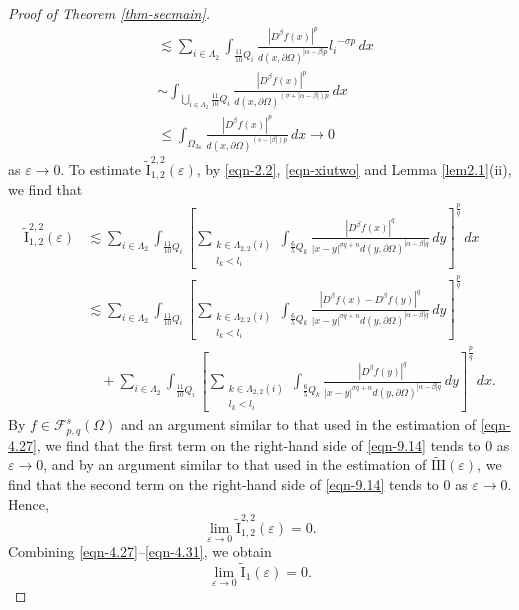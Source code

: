 \documentclass[11pt,twoside]{article}
\def\hf{{\mathscr F }}
\def\Qi{\frac{11}{10}Q_i}
\def\Qkk{\frac{6}{5}Q_k}
\def\az{\alpha}
\def\bz{\beta}
\def\boz{{\Omega}}
\def\sz{\sigma}
\def\vez{\varepsilon}
\def\pa{\partial}                %
\def\huae{\varepsilon}
\def\bozthreee{\boz_{3\huae}}
\def\huafweab{{\hf}_{p,q}^{s}(\boz)}
\theoremstyle{mylem}
\theoremstyle{definition}
\numberwithin{equation}{section}
\begin{document}
\begin{proof}[Proof of Theorem \ref{thm-secmain}]
\begin{align}
&\lesssim \sum_{i \in \Lambda_2} \int_{\Qi} \frac{ |D^\bz f(x)|^p}{{d(x,\pa\boz)}^{|\az-\bz|p}}  {l_i}^{-\sz p}\,dx\nonumber\\
&\sim \int_{\bigcup_{i \in \Lambda_2} \Qi} \frac{|D^\bz f(x)|^p}{d(x, \partial\Omega)^{(\sz+|\az-\bz|) p}}\,dx \nonumber \\
&\leq \int_{\bozthreee} \frac{|D^\bz f(x)|^p}{d(x, \partial\Omega)^{(s-|\bz|) p}}\,dx \to 0
\end{align}
as $\varepsilon \to 0.$ To estimate $\tilde{\mathrm{I}}_{1,2}^{2,2}(\vez)$, by \eqref{eqn-2.2}, \eqref{eqn-xiutwo} and Lemma \ref{lem2.1}(ii), we find that
\begin{align}\label{eqn-9.14}
\tilde{\mathrm{I}}_{1,2}^{2,2}(\vez)
&\lesssim \sum_{i \in \Lambda_2} \int_{\Qi} \left[ \sum_{\substack{k\in\Lambda_{2,2}(i) \\ l_k< l_i}}\int_{\Qkk} \frac{|D^\bz f(x)|^q }{|x - y|^{\sz q + n}d(y,\pa\boz)^{|\az-\bz|q}}\,dy \right]^{\frac{p}{q}}\,dx \nonumber\\
&\lesssim \sum_{i \in \Lambda_2} \int_{\Qi} \left[ \sum_{\substack{k\in\Lambda_{2,2}(i) \\ l_k< l_i}}\int_{\Qkk} \frac{| D^\bz f(x)-D^\bz f(y)|^q }{|x - y|^{\sz q + n}d(y,\pa\boz)^{|\az-\bz|q}} \,dy \right]^{\frac{p}{q}} \nonumber\\
&\quad+ \sum_{i \in \Lambda_2} \int_{\Qi} \left[ \sum_{\substack{k\in\Lambda_{2,2}(i) \\ l_k< l_i}}\int_{\Qkk}\frac{|D^\bz f(y)|^q }{|x - y|^{\sz q + n}d(y,\pa\boz)^{|\az-\bz|q}}\,dy \right]^{\frac{p}{q}}\,dx. 
\end{align}
By \( f \in \huafweab \) and an argument similar to that used in the estimation of \eqref{eqn-4.27}, we find that the first term on the right-hand side of \eqref{eqn-9.14} tends to 0 as $\vez\to 0$, and by an argument similar to that used in the estimation of  $\tilde{\mathrm{III}}(\vez)$, we find that the second term on the right-hand side of \eqref{eqn-9.14} tends to 0 as $\vez\to 0$. Hence,
\begin{equation}\label{eqn-4.31}
\lim_{\varepsilon \to 0}\tilde{\mathrm{I}}_{1,2}^{2,2}(\vez)= 0. 
\end{equation}
Combining \eqref{eqn-4.27}--\eqref{eqn-4.31}, we obtain
\begin{equation}\label{eqn-4.32}
\lim_{\varepsilon \to 0}\tilde{\mathrm{I}}_{1}(\vez)= 0.
\end{equation}


\end{proof}
\end{document}
